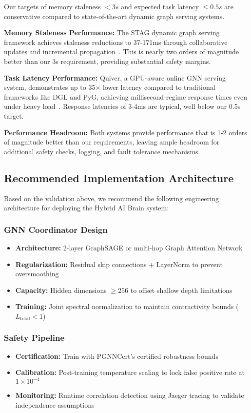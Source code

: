\documentclass{article}
\begin{document}
Our targets of memory staleness $< 3s$ and expected task latency $\leq 0.5s$ are conservative compared to state-of-the-art dynamic graph serving systems.

\textbf{Memory Staleness Performance:} The STAG dynamic graph serving framework achieves staleness reductions to 37-171ms through collaborative updates and incremental propagation~\cite{zhou2023stag}. This is nearly two orders of magnitude better than our 3s requirement, providing substantial safety margins.

\textbf{Task Latency Performance:} Quiver, a GPU-aware online GNN serving system, demonstrates up to 35× lower latency compared to traditional frameworks like DGL and PyG, achieving millisecond-regime response times even under heavy load~\cite{chen2023quiver}. Response latencies of 3-4ms are typical, well below our 0.5s target.

\textbf{Performance Headroom:} Both systems provide performance that is 1-2 orders of magnitude better than our requirements, leaving ample headroom for additional safety checks, logging, and fault tolerance mechanisms.

\subsection{Recommended Implementation Architecture}

Based on the validation above, we recommend the following engineering architecture for deploying the Hybrid AI Brain system:

\subsubsection{GNN Coordinator Design}
\begin{itemize}
    \item \textbf{Architecture:} 2-layer GraphSAGE or multi-hop Graph Attention Network
    \item \textbf{Regularization:} Residual skip connections + LayerNorm to prevent oversmoothing
    \item \textbf{Capacity:} Hidden dimensions $\geq 256$ to offset shallow depth limitations
    \item \textbf{Training:} Joint spectral normalization to maintain contractivity bounds ($L_{\text{total}} < 1$)
\end{itemize}

\subsubsection{Safety Pipeline}
\begin{itemize}
    \item \textbf{Certification:} Train with PGNNCert's certified robustness bounds~\cite{zhang2025pgnn}
    \item \textbf{Calibration:} Post-training temperature scaling to lock false positive rate at $1 \times 10^{-4}$
    \item \textbf{Monitoring:} Runtime correlation detection using Jaeger tracing to validate independence assumptions
\end{itemize}
\end{document}

